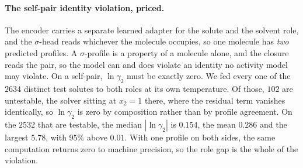 \paragraph{The self-pair identity violation, priced.}
The encoder carries a separate learned adapter for the solute and the solvent role, and the
$\sigma$-head reads whichever the molecule occupies, so one molecule has \emph{two} predicted
profiles. A $\sigma$-profile is a property of a molecule alone, and the closure reads the pair, so
the model can and does violate an identity no activity model may violate. On a self-pair, $\ln\gamma_2$ must be exactly zero. We fed every one of the $2634$ distinct test solutes to both
roles at its own temperature. Of those, $102$ are untestable, the solver sitting at $x_2=1$ there, where the
residual term vanishes identically, so $\ln\gamma_2$ is zero by composition rather than by profile
agreement. On the $2532$ that are testable, the median $|\ln\gamma_2|$ is $0.154$, the mean
$0.286$ and the largest $5.78$, with $95\%$ above $0.01$. With
one profile on both sides, the same computation returns zero to machine precision, so the role gap
is the whole of the violation.

